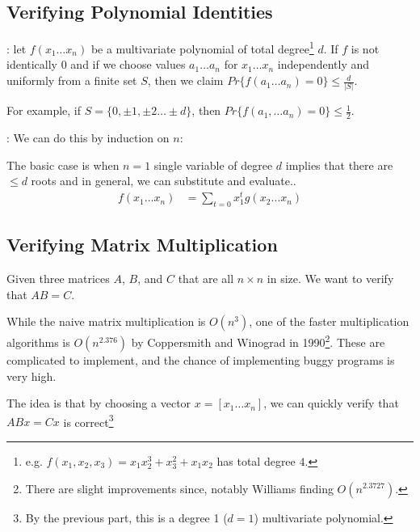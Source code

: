             \subsection{Verifying Polynomial Identities} %
            \label{sub:verifying_polynomial_identities}
                \Thm: let $f(x_1 \ldots x_n)$ be a multivariate polynomial of total degree\footnote{e.g. $f(x_1, x_2, x_3) = x_1 x_2^3 + x_3^2 + x_1 x_2$ has total degree $4$.} $d$.
                If $f$ is not identically $0$ and if we choose values $a_1 \ldots a_n$ for $x_1 \ldots x_n$ independently and uniformly from a finite set $S$,
                then we claim $Pr\{ f(a_1 \ldots a_n) = 0\} \le \frac{d}{|S|}$.

                For example, if $S = \{ 0, \pm 1, \pm 2 \ldots \pm d\}$, then $Pr\{f(a_1, \ldots a_n) = 0 \} \le \frac{1}{2}$.

                \Prf:
                We can do this by induction on $n$:

                The basic case is when $n=1$ single variable of degree $d$ implies that there are $\le d$ roots and in general, we can substitute and evaluate..
                \begin{align*}
                    f(x_1 \ldots x_n) &= \sum_{t=0} x_1^t g(x_2 \ldots x_n)
                \end{align*}
            \subsection{Verifying Matrix Multiplication} %
            \label{sub:verifying_matrix_multiplication}
                Given three matrices $A$, $B$, and $C$ that are all $n \times n$ in size. We want to verify that $AB = C$.

                While the naive matrix multiplication is $O(n^3)$, one of the faster multiplication algorithms is $O(n^{2.376})$ by Coppersmith and Winograd in 1990\footnote{There are slight improvements since, notably Williams finding $O(n^{2.3727})$.}.
                These are complicated to implement, and the chance of implementing buggy programs is very high.

                The idea is that by choosing a vector $x = [x_1 \ldots x_n]$, we can quickly verify that $ABx = Cx$ is correct\footnote{By the previous part, this is a degree 1 ($d=1$) multivariate polynomial.}

